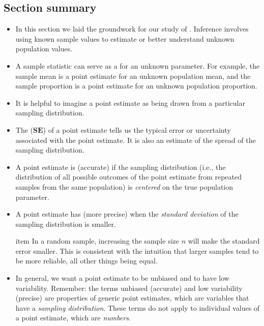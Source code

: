 \subsection*{Section summary}
\begin{itemize}
\item In this section we laid the groundwork for our study of .  Inference involves using known sample values to estimate or better understand unknown population values.

\item  A sample statistic can serve as a  for an unknown parameter.  For example, the sample mean is a point estimate for an unknown population mean, and the sample proportion is a point estimate for an unknown population proportion.

\item It is helpful to imagine a point estimate as being drawn from a particular sampling distribution.  

\item The  ($\textbf{SE}$) of a point estimate tells us the typical error or uncertainty associated with the point estimate.  It is also an estimate of the spread of the sampling distribution.  

\item A point estimate is  (accurate) if the sampling distribution (i.e., the distribution of all possible outcomes of the point estimate from repeated samples from the same population) is \textit{centered} on the true population parameter.  

\item A point estimate has  (more precise) when the \textit{standard deviation} of the sampling distribution is smaller. 

item In a random sample, increasing the sample size $n$ will make the standard error smaller.  This is consistent with the intuition that larger samples tend to be more reliable, all other things being equal.

\item In general, we want a point estimate to be unbiased and to have low variability.  Remember:  the terms unbiased (accurate) and low variability (precise) are properties of generic point estimates, which are variables that have a \emph{sampling distribution}.  These terms do not apply to individual values of a point estimate, which are \textit{numbers}.  

\end{itemize}


